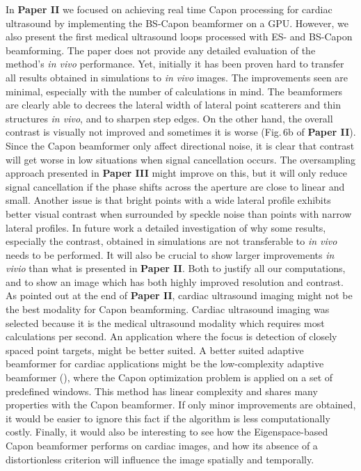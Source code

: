 In \textbf{Paper II} we focused on achieving real time Capon processing for cardiac ultrasound by implementing the BS-Capon beamformer on a GPU. However, we also present the first medical ultrasound loops processed with ES- and BS-Capon beamforming.  The paper does not provide any detailed evaluation of the method's \textit{in vivo} performance. Yet, initially it has been proven hard to transfer all results obtained in simulations to \textit{in vivo} images. The improvements seen are minimal, especially with the number of calculations in mind. The beamformers are clearly able to decrees the lateral width of lateral point scatterers and thin structures \textit{in vivo}, and to sharpen step edges. On the other hand, the overall contrast is visually not improved and sometimes it is worse (Fig.\,6b of \textbf{Paper II}). Since the Capon beamformer only affect directional noise, it is clear that contrast will get worse in low  situations when signal cancellation occurs. The oversampling approach presented in \textbf{Paper III} might improve on this, but it will only reduce signal cancellation if the phase shifts across the aperture are close to linear and small. Another issue is that bright points with a wide lateral profile exhibits better visual contrast when surrounded by speckle noise than points with narrow lateral profiles. In future work a detailed investigation of why some results, especially the contrast, obtained in simulations are not transferable to \textit{in vivo} needs to be performed. It will also be crucial to show larger improvements \textit{in vivio} than what is presented in \textbf{Paper II}. Both to justify all our computations, and to show an image which has both highly improved resolution and contrast. As pointed out at the end of \textbf{Paper II}, cardiac ultrasound imaging might not be the best modality for Capon beamforming. Cardiac ultrasound imaging was selected because it is the medical ultrasound modality which requires most calculations per second. An application where the focus is detection of closely spaced point targets, might be better suited. A better suited adaptive beamformer for cardiac applications might be the low-complexity adaptive beamformer (), where the Capon optimization problem is applied on a set of predefined windows. This method has linear complexity and shares many properties with the Capon beamformer. If only minor improvements are obtained, it would be easier to ignore this fact if the algorithm is less computationally costly. Finally, it would also be interesting to see how the Eigenspace-based Capon beamformer performs on cardiac images, and how its absence of a distortionless criterion will influence the image spatially and temporally.
